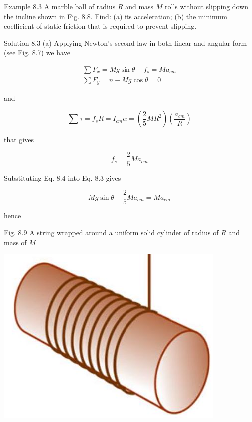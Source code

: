 \documentclass[10pt]{article}
\begin{document}
Example 8.3 A marble ball of radius $R$ and mass $M$ rolls without slipping down the incline shown in Fig. 8.8. Find: (a) its acceleration; (b) the minimum coefficient of static friction that is required to prevent slipping.

Solution 8.3 (a) Applying Newton's second law in both linear and angular form (see Fig. 8.7) we have


\begin{gather*}
\sum F_{x}=M g \sin \theta-f_{s}=M a_{c m}  \tag{8.3}\\
\sum F_{y}=n-M g \cos \theta=0
\end{gather*}


and

$$
\sum \tau=f_{s} R=I_{c m} \alpha=\left(\frac{2}{5} M R^{2}\right)\left(\frac{a_{c m}}{R}\right)
$$

that gives


\begin{equation*}
f_{s}=\frac{2}{5} M a_{c m} \tag{8.4}
\end{equation*}


Substituting Eq. 8.4 into Eq. 8.3 gives

$$
M g \sin \theta-\frac{2}{5} M a_{c m}=M a_{c m}
$$

hence

Fig. 8.9 A string wrapped around a uniform solid cylinder of radius of $R$ and mass of $M$

\begin{center}
\includegraphics[max width=\textwidth]{2024_09_13_db1f357d2aad0a03eb2eg-134}
\end{center}
\end{document}
